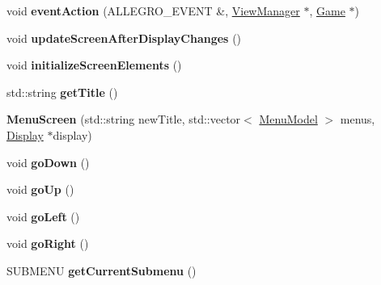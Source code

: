\begin{DoxyCompactItemize}
\item 
void {\bfseries event\+Action} (A\+L\+L\+E\+G\+R\+O\+\_\+\+E\+V\+E\+NT \&, \hyperlink{classViewManager}{View\+Manager} $\ast$, \hyperlink{classGame}{Game} $\ast$)\hypertarget{classMenuScreen_a88b7f24087e39bc51cfad7fe20d285e8}{}\label{classMenuScreen_a88b7f24087e39bc51cfad7fe20d285e8}

\item 
void {\bfseries update\+Screen\+After\+Display\+Changes} ()\hypertarget{classMenuScreen_a8a96f9e8ec773604623cee9f28981908}{}\label{classMenuScreen_a8a96f9e8ec773604623cee9f28981908}

\item 
void {\bfseries initialize\+Screen\+Elements} ()\hypertarget{classMenuScreen_a9b1934fd07f1f4d5e2290cbd99f4c82d}{}\label{classMenuScreen_a9b1934fd07f1f4d5e2290cbd99f4c82d}

\item 
std\+::string {\bfseries get\+Title} ()\hypertarget{classMenuScreen_ad4769529fa7e634808dcbe8ceca47537}{}\label{classMenuScreen_ad4769529fa7e634808dcbe8ceca47537}

\item 
{\bfseries Menu\+Screen} (std\+::string new\+Title, std\+::vector$<$ \hyperlink{classMenuModel}{Menu\+Model} $>$ menus, \hyperlink{classDisplay}{Display} $\ast$display)\hypertarget{classMenuScreen_a324689fac0fdf0ce9254616277cb0ef1}{}\label{classMenuScreen_a324689fac0fdf0ce9254616277cb0ef1}

\item 
void {\bfseries go\+Down} ()\hypertarget{classMenuScreen_a46bd6159e21766fea9a9e7bc0c5337b2}{}\label{classMenuScreen_a46bd6159e21766fea9a9e7bc0c5337b2}

\item 
void {\bfseries go\+Up} ()\hypertarget{classMenuScreen_a703f55fb295f4be1c2a7c2454e552024}{}\label{classMenuScreen_a703f55fb295f4be1c2a7c2454e552024}

\item 
void {\bfseries go\+Left} ()\hypertarget{classMenuScreen_a256f99b989b1c0ba37f289b4013e3bb0}{}\label{classMenuScreen_a256f99b989b1c0ba37f289b4013e3bb0}

\item 
void {\bfseries go\+Right} ()\hypertarget{classMenuScreen_ae353feb99de6f373896e628db8ff4f9a}{}\label{classMenuScreen_ae353feb99de6f373896e628db8ff4f9a}

\item 
S\+U\+B\+M\+E\+NU {\bfseries get\+Current\+Submenu} ()\hypertarget{classMenuScreen_a96ba9d51222d067f8c475f47833bb288}{}\label{classMenuScreen_a96ba9d51222d067f8c475f47833bb288}


\end{DoxyCompactItemize}
